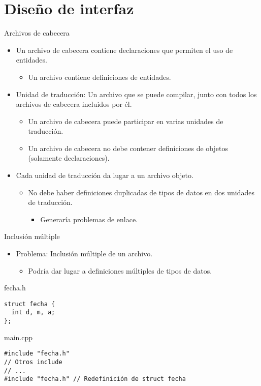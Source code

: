 \section{Diseño de interfaz}

\begin{frame}[t]{Archivos de cabecera}
\begin{itemize}
  \item Un archivo de cabecera contiene declaraciones que permiten el uso
        de entidades.
    \begin{itemize}
      \item Un archivo  contiene definiciones de entidades.
    \end{itemize}
  \item \alert{Unidad de traducción}: Un archivo que se puede compilar, junto con
        todos los archivos de cabecera incluidos por él.
    \begin{itemize}
      \item Un archivo de cabecera puede participar en varias unidades de traducción.
      \item Un archivo de cabecera no debe contener definiciones de objetos (solamente declaraciones).
    \end{itemize}
  \item Cada unidad de traducción da lugar a un archivo objeto.
    \begin{itemize}
      \item No debe haber definiciones duplicadas de tipos de datos en dos unidades de traducción.
        \begin{itemize}
          \item Generaría problemas de enlace.
        \end{itemize}
    \end{itemize}
\end{itemize}
\end{frame}

\begin{frame}[fragile]{Inclusión múltiple}
\begin{itemize}
  \item \alert{Problema}: Inclusión múltiple de un archivo.
    \begin{itemize}
      \item Podría dar lugar a definiciones múltiples de tipos de datos.
    \end{itemize}
\end{itemize}
\begin{block}{fecha.h}
\begin{lstlisting}
struct fecha {
  int d, m, a;
};
\end{lstlisting}
\end{block}
\begin{block}{main.cpp}
\begin{lstlisting}
#include "fecha.h"
// Otros include
// ...
#include "fecha.h" // Redefinición de struct fecha
\end{lstlisting}
\end{block}
\end{frame}

